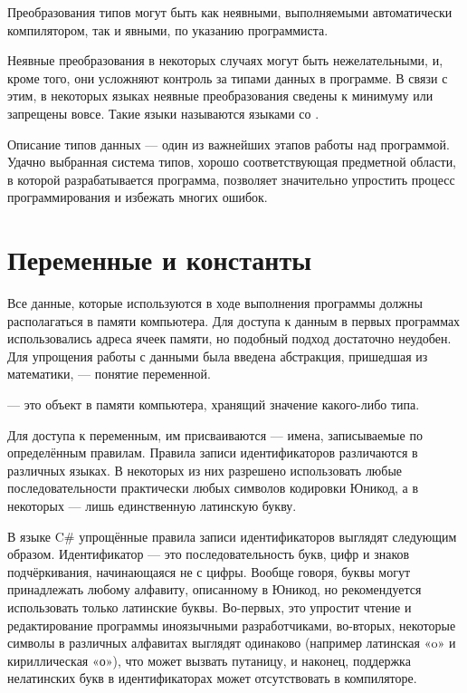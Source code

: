 Преобразования типов могут быть как неявными, выполняемыми
автоматически компилятором, так и явными, по указанию программиста.

Неявные преобразования в некоторых случаях могут быть нежелательными,
и, кроме того, они усложняют контроль за типами данных в программе.  В
связи с этим, в некоторых языках неявные преобразования сведены к
минимуму или запрещены вовсе. Такие языки называются языками со
.

Описание типов данных — один из важнейших этапов работы над
программой.  Удачно выбранная система типов, хорошо соответствующая
предметной области, в которой разрабатывается программа, позволяет
значительно упростить процесс программирования и избежать многих
ошибок.

\section{Переменные и константы}

Все данные, которые используются в ходе выполнения программы должны
располагаться в памяти компьютера. Для доступа к данным в первых
программах использовались адреса ячеек памяти, но подобный подход
достаточно неудобен. Для упрощения работы с данными была введена
абстракция, пришедшая из математики, — понятие переменной.

\begin{defn}
   — это объект в памяти компьютера,
  хранящий значение какого-либо типа.
\end{defn}

Для доступа к переменным, им присваиваются
 — имена, записываемые по
определённым правилам. Правила записи идентификаторов различаются в
различных языках. В некоторых из них разрешено использовать любые
последовательности практически любых символов кодировки Юникод, а в
некоторых — лишь единственную латинскую букву.

В языке C\# упрощённые правила записи идентификаторов выглядят
следующим образом. Идентификатор — это последовательность букв, цифр и
знаков подчёркивания, начинающаяся не с цифры. Вообще говоря, буквы
могут принадлежать любому алфавиту, описанному в Юникод, но
рекомендуется использовать только латинские буквы. Во-первых, это
упростит чтение и редактирование программы иноязычными разработчиками,
во-вторых, некоторые символы в различных алфавитах выглядят одинаково
(например латинская «o» и кириллическая «о»), что может вызвать
путаницу, и наконец, поддержка нелатинских букв в идентификаторах
может отсутствовать в компиляторе.

